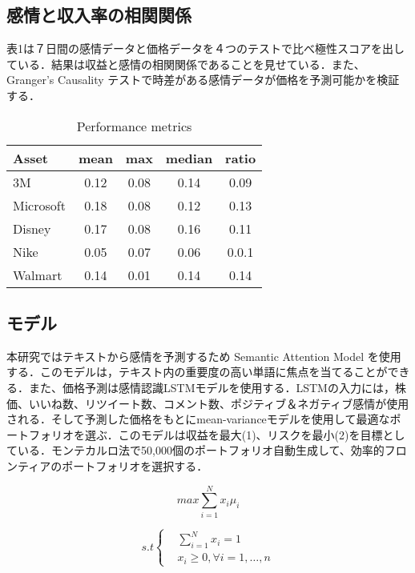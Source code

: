 \documentclass[submit,techrep,noauthor]{ipsj}
\begin{document}
\subsection{感情と収入率の相関関係}
表1は７日間の感情データと価格データを４つのテストで比べ極性スコアを出している．結果は収益と感情の相関関係であることを見せている．また、Granger’s Causality テストで時差がある感情データが価格を予測可能かを検証する．
\begin{table}[htb] %
\caption{Performance metrics} %
\label{release} %
\begin{center}
\begin{tabular}{| l | c | c  | c | c |} \hline %
Asset & mean & max & median & ratio  \\ \hline %
3M & 0.12 & 0.08 & 0.14 & 0.09 \\ 
Microsoft &0.18 & 0.08& 0.12 &  0.13 \\
Disney  &0.17 &   0.08 & 0.16 &  0.11\\
Nike   & 0.05& 0.07 & 0.06 &  0.0.1\\
Walmart  &0.14 &0.01 & 0.14 &  0.14\\ \hline
\end{tabular}
\end{center}
\end{table}

\subsection{モデル}
本研究ではテキストから感情を予測するため Semantic Attention Model \cite{third}を使用する．このモデルは，テキスト内の重要度の高い単語に焦点を当てることができる．また、価格予測は感情認識LSTMモデルを使用する．LSTMの入力には，株価、いいね数、リツイート数、コメント数、ポジティブ＆ネガティブ感情が使用される．そして予測した価格をもとにmean-varianceモデルを使用して最適なポートフォリオを選ぶ．このモデルは収益を最大(1)、リスクを最小(2)を目標としている．モンテカルロ法で50,000個のポートフォリオ自動生成して、効率的フロンティアのポートフォリオを選択する．


\begin{equation}
  max\sum_{i=1}^N x_i \mu_i
\end{equation}

\begin{equation}
  	s.t\left\{
		\begin{alignedat}{2} 
		& \sum_{i=1}^N x_i = 1\\
		& x_i  \ge 0, \forall i  = 1, \dots , n
		\end{alignedat} 
	\right.
\end{equation}
\end{document}
